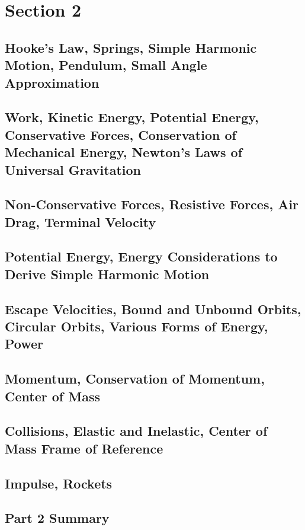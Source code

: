 \documentclass[../introphysics.tex]{subfiles}
\begin{document}
\chapter{Section 2}
\section{Hooke's Law, Springs, Simple Harmonic Motion, Pendulum, Small Angle Approximation}
\section{Work, Kinetic Energy, Potential Energy, Conservative Forces, Conservation of Mechanical Energy, Newton's Laws of Universal Gravitation}
\section{Non-Conservative Forces, Resistive Forces, Air Drag, Terminal Velocity}
\section{Potential Energy, Energy Considerations to Derive Simple Harmonic Motion}
\section{Escape Velocities, Bound and Unbound Orbits, Circular Orbits, Various Forms of Energy, Power}
\section{Momentum, Conservation of Momentum, Center of Mass}
\section{Collisions, Elastic and Inelastic, Center of Mass Frame of Reference}
\section{Impulse, Rockets}
\section{Part 2 Summary}
\end{document}
